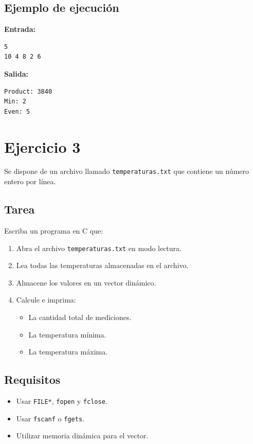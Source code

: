 \documentclass[12pt,a4paper]{article}
\begin{document}
\subsection*{Ejemplo de ejecución}
\textbf{Entrada:}
\begin{lstlisting}[numbers=none]
5
10 4 8 2 6
\end{lstlisting}

\textbf{Salida:}
\begin{lstlisting}[numbers=none]
Product: 3840
Min: 2
Even: 5
\end{lstlisting}
\newpage

\section*{Ejercicio 3}

Se dispone de un archivo llamado \texttt{temperaturas.txt} que contiene un número entero por línea.

\subsection*{Tarea}
Escriba un programa en C que:
\begin{enumerate}
    \item Abra el archivo \texttt{temperaturas.txt} en modo lectura.
    \item Lea todas las temperaturas almacenadas en el archivo.
    \item Almacene los valores en un vector dinámico.
    \item Calcule e imprima:
    \begin{itemize}
        \item La cantidad total de mediciones.
        \item La temperatura mínima.
        \item La temperatura máxima.
    \end{itemize}
\end{enumerate}

\subsection*{Requisitos}
\begin{itemize}
    \item Usar \texttt{FILE*}, \texttt{fopen} y \texttt{fclose}.
    \item Usar \texttt{fscanf} o \texttt{fgets}.
    \item Utilizar memoria dinámica para el vector.
\end{itemize}
\end{document}

